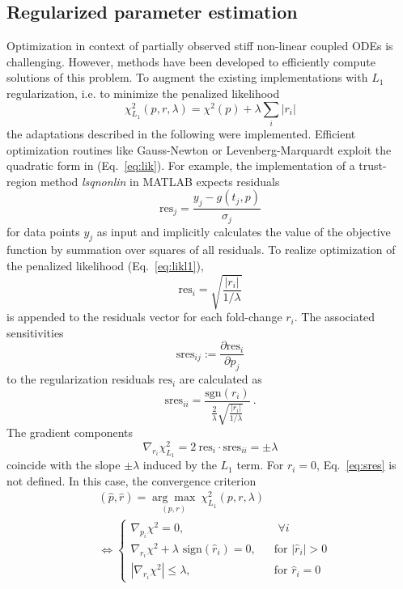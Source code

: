 \documentclass{bioinfo}
\begin{document}
\subsection{Regularized parameter estimation}
Optimization in context of partially observed stiff non-linear coupled ODEs is challenging.
However, methods have been developed to efficiently compute solutions of this problem.
To augment the existing implementations with $L_1$ regularization, i.e. to minimize the penalized likelihood
\begin{equation}
	\chi^2_{L_1}(p,r,\lambda) = \chi^2(p) + \lambda \sum_i |r_i|\label{eq:likl1}
\end{equation}
the adaptations described in the following were implemented.
Efficient optimization routines like Gauss-Newton or Levenberg-Marquardt exploit the quadratic form in (Eq.~\ref{eq:lik}).
For example, the implementation of a trust-region method \textit{lsqnonlin} in MATLAB expects residuals
\begin{equation}
	\text{res}_j = \frac{y_j-g(t_j,p)}{\sigma_j}
\end{equation}
for data points $y_j$ as input and implicitly calculates the value of the objective function by summation over squares of all residuals.
To realize optimization of the penalized likelihood (Eq.~\ref{eq:likl1}),
\begin{equation}
	\text{res}_i = \sqrt{\frac{|r_i|}{1/\lambda}}
\end{equation}
is appended to the residuals vector for each fold-change $r_i$.
The associated sensitivities
\begin{equation}
	\text{sres}_{ij} := \frac{\partial \text{res}_i}{\partial p_j} 
\end{equation}
to the regularization residuals $\text{res}_i$ are calculated as
\begin{equation}
	\text{sres}_{ii} = \frac{\text{sgn}(r_i)}{\frac{2}{\lambda}\sqrt{\frac{|r_i|}{1/\lambda}}} \:.\label{eq:sres}
\end{equation}
The gradient components
\begin{equation}
	\nabla_{r_i}\chi^2_{L_1} = 2 \: \text{res}_i \cdot \text{sres}_{ii} = \pm \lambda
\end{equation}
coincide with the slope $\pm \lambda$ induced by the $L_1$ term.
For $r_i = 0$, Eq.~\ref{eq:sres} is not defined.
In this case, the convergence criterion
\begin{align}
	&(\hat p, \hat r) = \underset{(p,r)}{\arg \max} \: \chi^2_{L_1}(p,r,\lambda) \\
	&\Leftrightarrow
	\begin{cases}
	\nabla_{p_i} \chi^2 = 0, \:\:& \text{ }\forall i\\
	\nabla_{r_i} \chi^2 + \lambda \text{ sign}(\hat r_i) = 0, \:\:& \text{ for } |\hat r_i| > 0\\
	|\nabla_{r_i} \chi^2| \le \lambda, \:\:& \text{ for } \hat r_i = 0
	\end{cases}
	\label{eq:convcrit}
\end{align}
\end{document}
